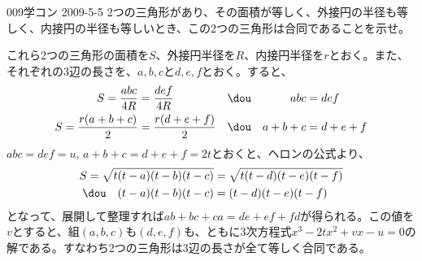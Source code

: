 \begin{prob}{009}{}{学コン 2009-5-5}
 2つの三角形があり、その面積が等しく、外接円の半径も等しく、内接円の半径も等しいとき、この2つの三角形は合同であることを示せ。
\end{prob}
これら2つの三角形の面積を$S$、外接円半径を$R$、内接円半径を$r$とおく。また、それぞれの3辺の長さを、$a, b, c$と$d, e, f$とおく。すると、
\begin{align*}
 S=\frac{abc}{4R}&=\frac{def}{4R} & &\dou & abc&=def \\
 S=\frac{r(a+b+c)}{2}&=\frac{r(d+e+f)}{2} & &\dou & a+b+c&=d+e+f
\end{align*}
$abc=def=u$, $a+b+c=d+e+f=2t$とおくと、ヘロンの公式より、
\begin{align*}
 S=\sqrt{t(t-a)(t-b)(t-c)}&=\sqrt{t(t-d)(t-e)(t-f)} \\
 \dou \quad (t-a)(t-b)(t-c)&=(t-d)(t-e)(t-f)
\end{align*}
となって、展開して整理すれば$ab+bc+ca=de+ef+fd$が得られる。この値を$v$とすると、組$(a, b, c)$も$(d, e, f)$も、ともに3次方程式$x^3-2tx^2+vx-u=0$の解である。すなわち2つの三角形は3辺の長さが全て等しく合同である。